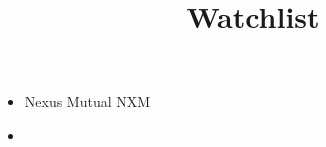 \documentclass{../notes}
\title{Watchlist}
\begin{document}
\maketitle

\begin{itemize}
    \item Nexus Mutual NXM
    \item 
\end{itemize}
\end{document}
